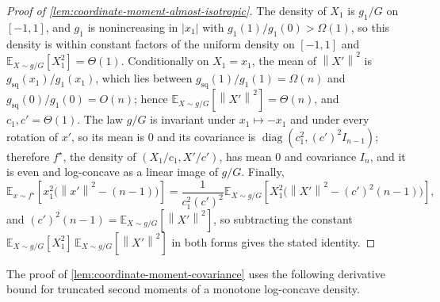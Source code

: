 \documentclass[11pt]{article}
\numberwithin{equation}{section}
\theoremstyle{definition}
\newcommand{\E}[2]{\mathbb{E}_{#1}\left[#2\right]}
\newcommand{\norm}[1]{\left\lVert#1\right\rVert}
\begin{document}
\begin{proof}[Proof of \cref{lem:coordinate-moment-almost-isotropic}]
The density of $X_1$ is
$g_1/G$ on
$[-1,1]$, and
$g_1$ is nonincreasing in
$|x_1|$ with
$g_1(1)/g_1(0)>\Omega(1)$, so this density is within constant factors of the
uniform density on
$[-1,1]$ and
$\E{X\sim g/G}{X_1^2}=\Theta(1)$.
Conditionally on $X_1=x_1$, the mean of
$\norm{X'}^2$ is
$g_{\mathrm{sq}}(x_1)/g_1(x_1)$, which lies between
$g_{\mathrm{sq}}(1)/g_1(1)=\Omega(n)$ and
$g_{\mathrm{sq}}(0)/g_1(0)=O(n)$; hence
$\E{X\sim g/G}{\norm{X'}^2}=\Theta(n)$, and
$c_1,c'=\Theta(1)$.
The law $g/G$ is invariant under $x_1\mapsto-x_1$ and under every rotation of
$x'$, so its mean is
$0$ and its covariance is
$\operatorname{diag}(c_1^2,(c')^2I_{n-1})$; therefore
$f^\star$, the density of
$(X_1/c_1,X'/c')$, has mean
$0$ and covariance
$I_n$, and it is even and log-concave as a linear image of
$g/G$.
Finally,
\[
\E{x\sim f^\star}{x_1^2\bigl(\norm{x'}^2-(n-1)\bigr)}
=\frac{1}{c_1^2(c')^2}
\E{X\sim g/G}{X_1^2\bigl(\norm{X'}^2-(c')^2(n-1)\bigr)},
\]
and $(c')^2(n-1)=\E{X\sim g/G}{\norm{X'}^2}$, so subtracting the constant
$\E{X\sim g/G}{X_1^2}\,\E{X\sim g/G}{\norm{X'}^2}$ in both forms gives the
stated identity.
\end{proof}

The proof of \cref{lem:coordinate-moment-covariance} uses the following
derivative bound for truncated second moments of a monotone log-concave
density.
\end{document}

